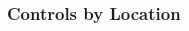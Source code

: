 \documentclass{beamer}
\begin{document}
\begin{frame}
\frametitle{Controls by Location}
\begin{columns}[T]
\begin{column}{.7\textwidth}
\begin{figure}
\setlength{\fboxsep}{0pt}%
\setlength{\fboxrule}{1pt}%
\end{figure}
\end{column}

\begin{column}{.3\textwidth}
\begin{figure}
\setlength{\fboxsep}{0pt}%
\setlength{\fboxrule}{1pt}%
\end{figure}
\end{column}
\end{columns}
\end{frame}



  
\end{document}
